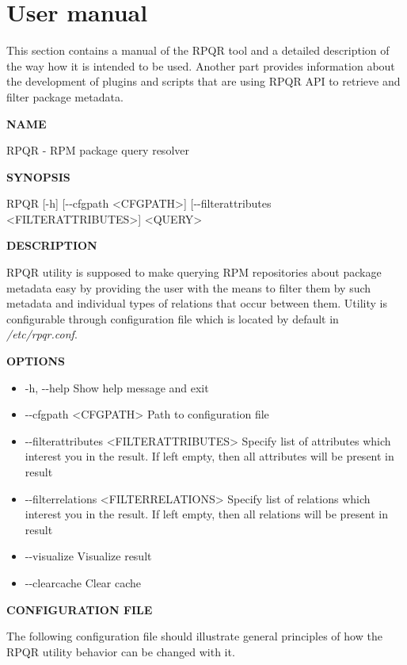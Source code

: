 \section{User manual}
This section contains a manual of the RPQR tool and a detailed description of the way how it is intended to be
used. Another part provides information about the development of plugins and scripts that are using RPQR
API to retrieve and filter package metadata.

\textbf{NAME}

RPQR - RPM package query resolver

\textbf{SYNOPSIS}

RPQR [-h] [-{}-cfgpath <CFGPATH>] [-{}-filterattributes <FILTERATTRIBUTES>]  <QUERY>

\textbf{DESCRIPTION}

RPQR utility is supposed to make querying RPM repositories about package metadata easy by providing
the user with the means to filter them by such metadata and individual types of relations that occur between
them. Utility is configurable through configuration file which is located by default in \textit{/etc/rpqr.conf}.

\textbf{OPTIONS}

\begin{itemize}
  \item -h, -{}-help
    \subitem Show help message and exit
  \item -{}-cfgpath <CFGPATH>
    \subitem Path to configuration file
  \item -{}-filterattributes <FILTERATTRIBUTES>
    \subitem Specify list of attributes which interest you in the result. If left empty, then all attributes will be present in result
  \item -{}-filterrelations <FILTERRELATIONS>
    \subitem Specify list of relations which interest you in the result. If left empty, then all relations will be present in result
  \item -{}-visualize
    \subitem Visualize result
  \item -{}-clearcache
    \subitem Clear cache
\end{itemize}

\textbf{CONFIGURATION FILE}

The following configuration file should illustrate general principles of how the RPQR utility behavior
can be changed with it.

